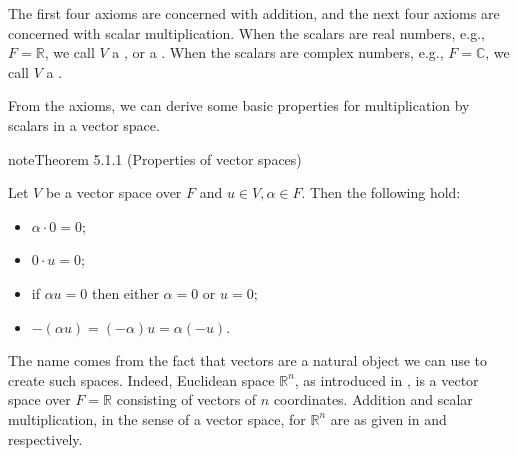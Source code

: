 \documentclass[letterpaper,10pt,english]{jupyterBook}
\begin{document}
\sphinxAtStartPar
The first four axioms are concerned with addition, and the next four axioms are concerned with scalar multiplication. When the scalars are real numbers, e.g., \(F = \mathbb{R}\), we call \(V\) a , or a . When the scalars are complex numbers, e.g., \(F=\mathbb{C}\), we call \(V\) a .

\sphinxAtStartPar
From the axioms, we can derive some basic properties for multiplication by scalars in a vector space.
\label{_pages/5.1_Vector_spaces_definitions:properties-of-vector-spaces-theorem}
\begin{sphinxadmonition}{note}{Theorem 5.1.1 (Properties of vector spaces)}



\sphinxAtStartPar
Let \(V\) be a vector space over \(F\) and \(u \in V,\alpha\in F\). Then the following hold:
\begin{itemize}
\item {} 
\sphinxAtStartPar
\(\alpha \cdot 0 = 0\);

\item {} 
\sphinxAtStartPar
\(0 \cdot u = 0\);

\item {} 
\sphinxAtStartPar
if \(\alpha u = 0\) then either \(\alpha = 0\) or \(u = 0\);

\item {} 
\sphinxAtStartPar
\(-(\alpha u) = (-\alpha)u = \alpha (-u)\).

\end{itemize}
\end{sphinxadmonition}

\sphinxAtStartPar
The name  comes from the fact that vectors are a natural object we can use to create such spaces. Indeed, Euclidean space \(\mathbb{R}^n\), as introduced in {\hyperref[\detokenize{_pages/3.0_Vectors:vectors-chapter}]{}}, is a vector space over \(F=\mathbb{R}\) consisting of vectors of \(n\) coordinates. Addition and scalar multiplication, in the sense of a vector space, for \(\mathbb{R}^n\) are as given in {\hyperref[\detokenize{_pages/3.1_Vector_arithmetic:vector-addition-definition}]{}} and {\hyperref[\detokenize{_pages/3.1_Vector_arithmetic:scalar-multiplication-of-a-vector-definition}]{}} respectively.
\end{document}
